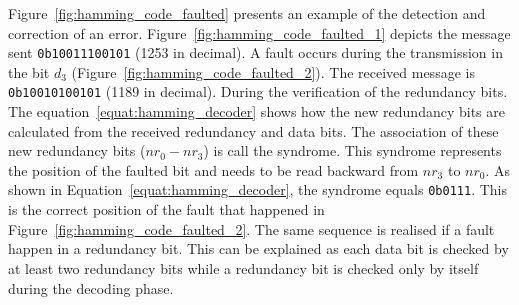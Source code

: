 Figure~\ref{fig:hamming_code_faulted} presents an example of the detection and correction of an error. Figure~\ref{fig:hamming_code_faulted_1} depicts the message sent \texttt{0b10011100101} (1253 in decimal). A fault occurs during the transmission in the bit $d_3$ (Figure~\ref{fig:hamming_code_faulted_2}). The received message is \texttt{0b10010100101} (1189 in decimal).
During the verification of the redundancy bits. The equation~\ref{equat:hamming_decoder} shows how the new redundancy bits are calculated from the received redundancy and data bits. The association of these new redundancy bits ($nr_{0}-nr_{3}$) is call the syndrome. This syndrome represents the position of the faulted bit and needs to be read backward from $nr_3$ to $nr_0$. As shown in Equation~\ref{equat:hamming_decoder}, the syndrome equals \texttt{0b0111}. This is the correct position of the fault that happened in Figure~\ref{fig:hamming_code_faulted_2}. The same sequence is realised if a fault happen in a redundancy bit. This can be explained as each data bit is checked by at least two redundancy bits while a redundancy bit is checked only by itself during the decoding phase.

